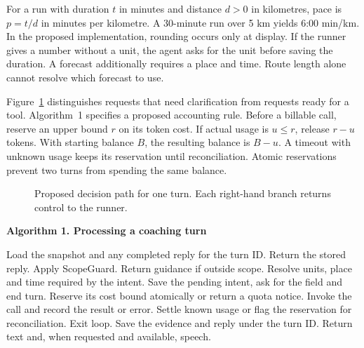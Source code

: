 \documentclass[conference]{IEEEtran}
\begin{document}
For a run with duration $t$ in minutes and distance $d>0$ in kilometres, pace is $p=t/d$ in minutes per kilometre. A 30-minute run over 5 km yields 6:00 min/km. In the proposed implementation, rounding occurs only at display. If the runner gives a number without a unit, the agent asks for the unit before saving the duration. A forecast additionally requires a place and time. Route length alone cannot resolve which forecast to use.

Figure~\ref{fig:flow} distinguishes requests that need clarification from requests ready for a tool. Algorithm~1 specifies a proposed accounting rule. Before a billable call, reserve an upper bound $r$ on its token cost. If actual usage is $u\leq r$, release $r-u$ tokens. With starting balance $B$, the resulting balance is $B-u$. A timeout with unknown usage keeps its reservation until reconciliation. Atomic reservations prevent two turns from spending the same balance.

\begin{figure}[htbp]\centering
{}
\caption{Proposed decision path for one turn. Each right-hand branch returns control to the runner.}\label{fig:flow}
\end{figure}

\par\smallskip\noindent\textbf{Algorithm 1. Processing a coaching turn}\par
\begin{algorithmic}[1]
\STATE Load the snapshot and any completed reply for the turn ID.
  \STATE Return the stored reply.
\ENDIF
\STATE Apply ScopeGuard. Return guidance if outside scope.
\STATE Resolve units, place and time required by the intent.
  \STATE Save the pending intent, ask for the field and end turn.
\ENDIF
{}
  \STATE Reserve its cost bound atomically or return a quota notice.
  \STATE Invoke the call and record the result or error.
  \STATE Settle known usage or flag the reservation for reconciliation.
    \STATE Exit loop.
  \ENDIF
\ENDFOR
\STATE Save the evidence and reply under the turn ID.
\STATE Return text and, when requested and available, speech.
\end{algorithmic}
\end{document}
